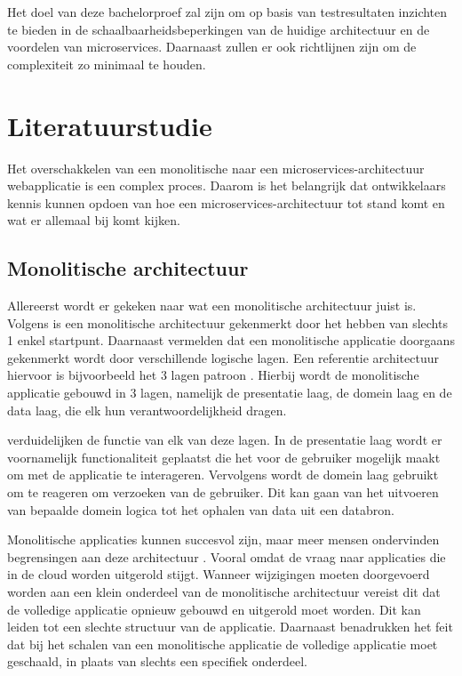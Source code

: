 Het doel van deze bachelorproef zal zijn om op basis van testresultaten inzichten te bieden in de schaalbaarheidsbeperkingen van de huidige architectuur en de voordelen van microservices. Daarnaast zullen er ook richtlijnen zijn om de complexiteit zo minimaal te houden.


\section{Literatuurstudie}%
\label{sec:literatuurstudie}

Het overschakkelen van een monolitische naar een microservices-architectuur webapplicatie is een complex proces. Daarom is het belangrijk dat ontwikkelaars kennis kunnen opdoen van hoe een microservices-architectuur tot stand komt en wat er allemaal bij komt kijken.

\subsection{Monolitische architectuur}

Allereerst wordt er gekeken naar wat een monolitische architectuur juist is. Volgens \textcite{Velepucha2023} is een monolitische architectuur gekenmerkt door het hebben van slechts 1 enkel startpunt. Daarnaast vermelden \textcite{Velepucha2023} dat een monolitische applicatie doorgaans gekenmerkt wordt door verschillende logische lagen. Een referentie architectuur hiervoor is bijvoorbeeld het 3 lagen patroon \autocite{Velepucha2023}. Hierbij wordt de monolitische applicatie gebouwd in 3 lagen, namelijk de presentatie laag, de domein laag en de data laag, die elk hun verantwoordelijkheid dragen.

\textcite{Blinowski2022} verduidelijken de functie van elk van deze lagen. In de presentatie laag wordt er voornamelijk functionaliteit geplaatst die het voor de gebruiker mogelijk maakt om met de applicatie te interageren. Vervolgens wordt de domein laag gebruikt om te reageren om verzoeken van de gebruiker. Dit kan gaan van het uitvoeren van bepaalde domein logica tot het ophalen van data uit een databron.

Monolitische applicaties kunnen succesvol zijn, maar meer mensen ondervinden begrensingen aan deze architectuur \autocite{Lewis2014}. Vooral omdat de vraag naar applicaties die in de cloud worden uitgerold stijgt. Wanneer wijzigingen moeten doorgevoerd worden aan een klein onderdeel van de monolitische architectuur vereist dit dat de volledige applicatie opnieuw gebouwd en uitgerold moet worden. Dit kan leiden tot een slechte structuur van de applicatie. Daarnaast benadrukken \textcite{Lewis2014} het feit dat bij het schalen van een monolitische applicatie de volledige applicatie moet geschaald, in plaats van slechts een specifiek onderdeel.

